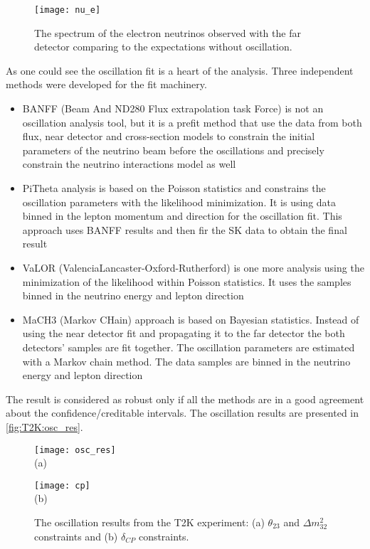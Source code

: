 \documentclass[../main.tex]{subfiles}
\begin{document}
\begin{figure}[ht!]
  \centering
  \texttt{[image: nu\_e]}
  \caption{The spectrum of the electron neutrinos observed with the far detector comparing to the expectations without oscillation.}
  \label{fig:t2k:nu_e}
\end{figure}

As one could see the oscillation fit is a heart of the analysis. Three independent methods were developed for the fit machinery.
\begin{itemize}
  \item BANFF (Beam And ND280 Flux extrapolation task Force) is not an oscillation analysis tool, but it is a prefit method that use the data from both flux, near detector and cross-section models to constrain the initial parameters of the neutrino beam before the oscillations and precisely constrain the neutrino interactions model as well
  \item PiTheta analysis is based on the Poisson statistics and constrains the oscillation parameters with the likelihood minimization. It is using data binned in the lepton momentum and direction for the oscillation fit. This approach uses BANFF results and then fir the SK data to obtain the final result
  \item VaLOR (ValenciaLancaster-Oxford-Rutherford) is one more analysis using the minimization of the likelihood within Poisson statistics. It uses the samples binned in the neutrino energy and lepton direction
  \item MaCH3 (Markov CHain) approach is based on Bayesian statistics. Instead of using the near detector fit and propagating it to the far detector the both detectors' samples are fit together. The oscillation parameters are estimated with a Markov chain method. The data samples are binned in the neutrino energy and lepton direction
\end{itemize}

The result is considered as robust only if all the methods are in a good agreement about the confidence/creditable intervals. The oscillation results are presented in \autoref{fig:T2K:osc_res}.

\begin{figure}[h!]
  \centering
  \begin{minipage}{0.49\linewidth}
    \centering
    \texttt{[image: osc\_res]} \\ (a)
  \end{minipage}
  \begin{minipage}{0.49\linewidth}
    \centering
    \texttt{[image: cp]} \\ (b)
  \end{minipage}
    \caption{The oscillation results from the T2K experiment: (a) $\theta_{23}$ and $\Delta m_{32}^2$ constraints and (b) $\delta_{CP}$ constraints.}
    \label{fig:T2K:osc_res}
\end{figure}
\end{document}
